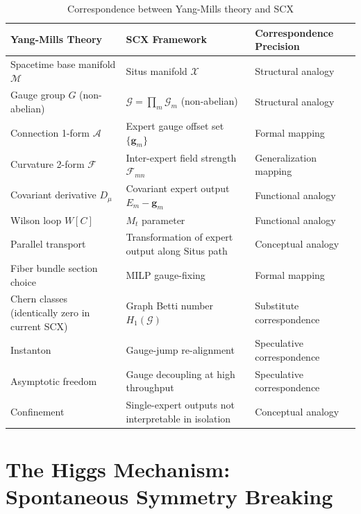 \documentclass[12pt,a4paper]{article}
\newcommand{\grph}{\mathcal{G}}
\theoremstyle{remark}
\newcommand{\gaugeparam}{\mathbf{g}}
\newcommand{\calG}{\mathcal{G}}
\begin{document}
\begin{table}[H]
\centering
\caption{Correspondence between Yang-Mills theory and SCX}
\label{tab:ym_correspondence}
\begin{tabular}{p{4.5cm} p{4.5cm} p{4.5cm}}
\toprule
\textbf{Yang-Mills Theory} & \textbf{SCX Framework} & \textbf{Correspondence Precision} \\
\midrule
Spacetime base manifold $\mathcal{M}$ & Situs manifold $\mathcal{X}$ & Structural analogy \\
Gauge group $G$ (non-abelian) & $\calG = \prod_m \calG_m$ (non-abelian) & Structural analogy \\
Connection 1-form $\mathcal{A}$ & Expert gauge offset set $\{\gaugeparam_m\}$ & Formal mapping \\
Curvature 2-form $\mathcal{F}$ & Inter-expert field strength $\mathcal{F}_{mn}$ & Generalization mapping \\
Covariant derivative $D_\mu$ & Covariant expert output $E_m - \gaugeparam_m$ & Functional analogy \\
Wilson loop $W[C]$ & $M_t$ parameter & Functional analogy \\
Parallel transport & Transformation of expert output along Situs path & Conceptual analogy \\
Fiber bundle section choice & MILP gauge-fixing & Formal mapping \\
Chern classes (identically zero in current SCX) & Graph Betti number $H_1(\grph)$ & Substitute correspondence \\
Instanton & Gauge-jump re-alignment & Speculative correspondence \\
Asymptotic freedom & Gauge decoupling at high throughput & Speculative correspondence \\
Confinement & Single-expert outputs not interpretable in isolation & Conceptual analogy \\
\bottomrule
\end{tabular}
\end{table}

\newpage

\section{The Higgs Mechanism: Spontaneous Symmetry Breaking}

\end{document}
